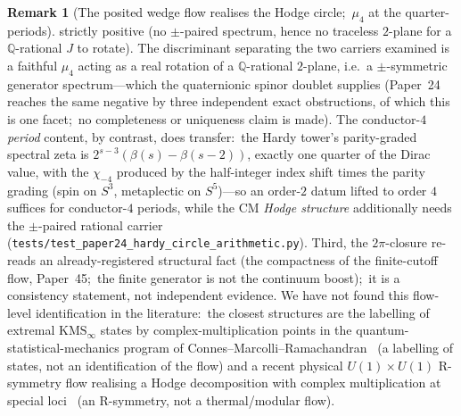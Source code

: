 \documentclass[11pt,a4paper]{article}
\theoremstyle{plain}
\theoremstyle{definition}
\newtheorem{remark}[theorem]{Remark}
\newcommand{\Q}{\mathbb{Q}}
\begin{document}
\begin{remark}[The posited wedge flow realises the Hodge circle;\ $\mu_4$ at the
quarter-periods]
strictly positive (no $\pm$-paired spectrum, hence no traceless
$2$-plane for a $\Q$-rational $J$ to rotate).  The discriminant separating the two carriers examined is a
faithful $\mu_4$ acting as a real rotation of a $\Q$-rational $2$-plane, i.e.\
a $\pm$-symmetric generator spectrum---which the quaternionic spinor
doublet supplies (Paper~24 reaches the same negative by three independent
exact obstructions, of which this is one facet;\ no completeness or
uniqueness claim is made).  The conductor-$4$ \emph{period} content, by
contrast, does transfer:\ the Hardy tower's parity-graded spectral zeta is
$2^{s-3}(\beta(s)-\beta(s-2))$, exactly one quarter of the Dirac value, with
the $\chi_{-4}$ produced by the half-integer index shift times the parity
grading (spin on $S^3$,
metaplectic on $S^5$)---so an order-$2$ datum lifted to order $4$ suffices for
conductor-$4$ periods, while the CM \emph{Hodge structure} additionally needs
the $\pm$-paired rational carrier
(\texttt{tests/test\_paper24\_hardy\_circle\_arithmetic.py}).  Third,
the $2\pi$-closure re-reads an already-registered structural fact (the
compactness of the finite-cutoff flow, Paper~45;\ the finite generator is
not the continuum boost);\ it is a consistency statement, not
independent evidence.  We have not found this flow-level identification in the
literature:\ the closest structures are the labelling of extremal
$\mathrm{KMS}_\infty$ states by complex-multiplication points in the
quantum-statistical-mechanics program of
Connes--Marcolli--Ramachandran~\cite{connes_marcolli_ramachandran2005} (a
labelling of states, not an identification of the flow) and a recent physical
$U(1)\times U(1)$ R-symmetry flow realising a Hodge decomposition with complex
multiplication at special loci~\cite{angius_volpato2026} (an R-symmetry, not a
thermal/modular flow).
\end{remark}
\end{document}
